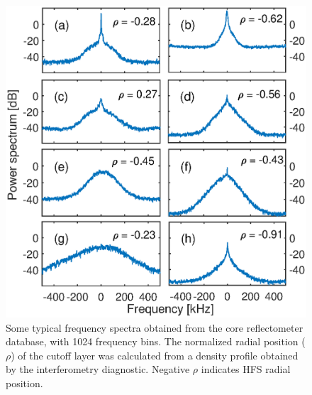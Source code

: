 \begin{figure}[!h]
\begin{centering}
\includegraphics[scale=0.55]{fig_Spectra.eps}
\par\end{centering}
\caption[Representative spectra in the database]{Some typical frequency spectra obtained from the core reflectometer database, with 1024 frequency bins. The normalized radial position ($\rho$) of the cutoff layer was calculated from a density profile obtained by the interferometry diagnostic. Negative $\rho$ indicates HFS radial position.}
\label{fig:Spectra}
\end{figure}



